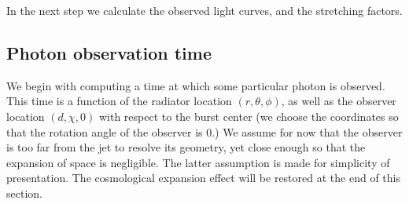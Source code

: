 \documentclass[manuscript]{aastex}
\begin{document}
In the next step we calculate the observed light curves, and the
stretching factors.

\subsection{Photon observation time}

We begin with computing a time at which some particular photon is
observed. This time is a function of the radiator location $\left(r,
\theta, \phi\right)$, as well as the observer location $\left(d, \chi,
0\right)$ with respect to the burst center (we choose the coordinates
so that the rotation angle of the observer is $0$.) We assume for now
that the observer is too far from the jet to resolve its geometry, yet
close enough so that the expansion of space is negligible. The latter
assumption is made for simplicity of presentation. The cosmological
expansion effect will be restored at the end of this section.
\end{document}
